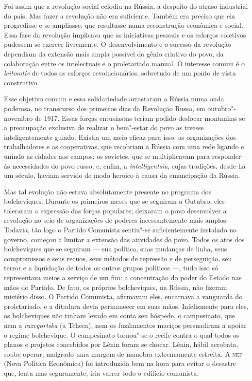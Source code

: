 Foi assim que a revolução social eclodiu na Rússia, a despeito do atraso
industrial do país. Mas fazer a revolução não era suficiente. Também
era preciso que ela progredisse e se ampliasse, que resultasse numa
reconstrução econômica e social. Essa fase da revolução implicava que
as iniciativas pessoais e os esforços coletivos pudessem se exercer
livremente. O desenvolvimento e o sucesso da revolução dependiam da
extensão mais ampla possível do gênio criativo do povo, da colaboração
entre os intelectuais e o proletariado manual. O interesse comum é o
\textit{leitmotiv} de todos os esforços revolucionários, sobretudo de um ponto
de vista construtivo.

Esse objetivo comum e essa solidariedade arrastaram a Rússia numa onda
poderosa, no transcurso dos primeiros dias da Revolução Russa, em
outubro"-novembro de 1917. Essas forças entusiastas teriam podido
deslocar montanhas se a preocupação exclusiva de realizar o
bem"-estar do povo as tivesse inteligentemente guiado. Existia um meio
eficaz para isso: as organizações dos trabalhadores e as cooperativas,
que recobriam a Rússia com uma rede ligando e unindo as cidades aos
campos; os sovietes, que se multiplicavam para responder às
necessidades do povo russo; e, enfim, a \textit{intelligentsia}, cujas
tradições, desde há um século, haviam servido de modo heroico à causa
da emancipação da Rússia.

Mas tal evolução não estava absolutamente presente no programa dos
bolcheviques. Durante os primeiros meses que se seguiram a Outubro,
eles toleraram a expressão das forças populares; deixaram o povo
desenvolver a revolução no seio de organizações de poderes
incessantemente mais amplos. Todavia, tão logo o Partido Comunista
sentiu"-se suficientemente instalado no governo, começou a limitar a
extensão das atividades do povo. Todos os atos dos bolcheviques que se
seguiram --- sua política, suas mudanças de linha, seus compromissos e
seus recuos, seus métodos de repressão e de perseguição, seu terror e a
liquidação de todos os outros grupos políticos ---, tudo isso só
representava meios a serviço de um fim: a concentração do poder do
Estado nas mãos do Partido. De fato, os próprios bolcheviques, na
Rússia, não fizeram mistério disso. O Partido Comunista, afirmavam
eles, encarnava a vanguarda do proletariado, e a ditadura devia
permanecer em suas mãos. Infelizmente para eles, os bolcheviques não
tinham levado em conta seu hóspede, o campesinato, que nem a
\textit{razvyortska} (a Tcheca), nem os fuzilamentos maciços persuadiram a
apoiar o regime bolchevique. O campesinato tornou"-se o recife contra
o qual todos os planos e projetos concebidos por Lênin foram se chocar.
Lênin, hábil acrobata, soube operar, malgrado uma margem de manobra
extremamente estreita. A \textsc{nep} (Nova Política Econômica) foi introduzida
bem na hora para evitar o desastre que, lenta mas seguramente, iria
varrer todo o edifício comunista.

